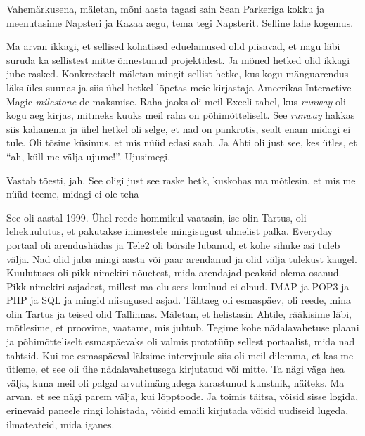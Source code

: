 Vahemärkusena, mäletan, mõni aasta  tagasi sain Sean Parkeriga kokku ja meenutasime  Napsteri ja Kazaa aegu, tema tegi Napsterit. Selline lahe kogemus.

Ma arvan ikkagi, et sellised kohatised eduelamused olid piisavad, et nagu läbi suruda ka sellistest mitte õnnestunud projektidest. Ja mõned hetked olid ikkagi jube rasked. Konkreetselt mäletan mingit sellist hetke, kus kogu mänguarendus läks üles-suunas ja siis ühel hetkel lõpetas meie kirjastaja Ameerikas Interactive Magic \emph{milestone}-de maksmise. Raha jaoks oli meil Exceli tabel, kus \emph{runway} oli kogu aeg kirjas, mitmeks kuuks  meil raha on põhimõtteliselt. See \emph{runway} hakkas siis kahanema ja ühel hetkel oli selge, et nad on pankrotis, sealt enam midagi ei tule. Oli tõsine küsimus, et mis nüüd edasi saab. Ja Ahti oli just see, kes ütles, et \enquote{ah, küll me välja ujume!}. Ujusimegi.


Vastab tõesti, jah. See oligi just see raske hetk, kuskohas ma mõtlesin, et mis me nüüd teeme, midagi ei ole teha


See oli aastal 1999. Ühel reede hommikul vaatasin, ise olin Tartus, oli lehekuulutus, et pakutakse inimestele mingisugust ulmelist palka. Everyday portaal oli arendushädas ja Tele2 oli börsile lubanud, et kohe sihuke asi tuleb välja. Nad olid juba mingi aasta või paar arendanud ja olid välja tulekust kaugel. Kuulutuses oli  pikk nimekiri  nõuetest, mida arendajad peaksid olema osanud. Pikk nimekiri asjadest, millest ma elu sees kuulnud ei olnud. IMAP ja POP3 ja PHP ja SQL ja mingid niisugused asjad. Tähtaeg oli esmaspäev, oli reede, mina olin Tartus ja teised olid Tallinnas. Mäletan, et helistasin Ahtile,  rääkisime läbi, mõtlesime, et proovime, vaatame, mis juhtub. Tegime kohe  nädalavahetuse plaani ja põhimõtteliselt esmaspäevaks oli valmis prototüüp sellest portaalist, mida nad tahtsid. Kui me esmaspäeval läksime intervjuule siis oli meil dilemma, et kas me ütleme, et see oli ühe nädalavahetusega kirjutatud või mitte. Ta nägi väga hea välja, kuna meil oli palgal arvutimängudega karastunud kunstnik, näiteks. Ma arvan, et see nägi  parem välja, kui lõpptoode. Ja toimis täitsa, võisid  sisse logida, erinevaid paneele ringi lohistada, võisid emaili kirjutada võisid uudiseid lugeda, ilmateateid, mida iganes. 

